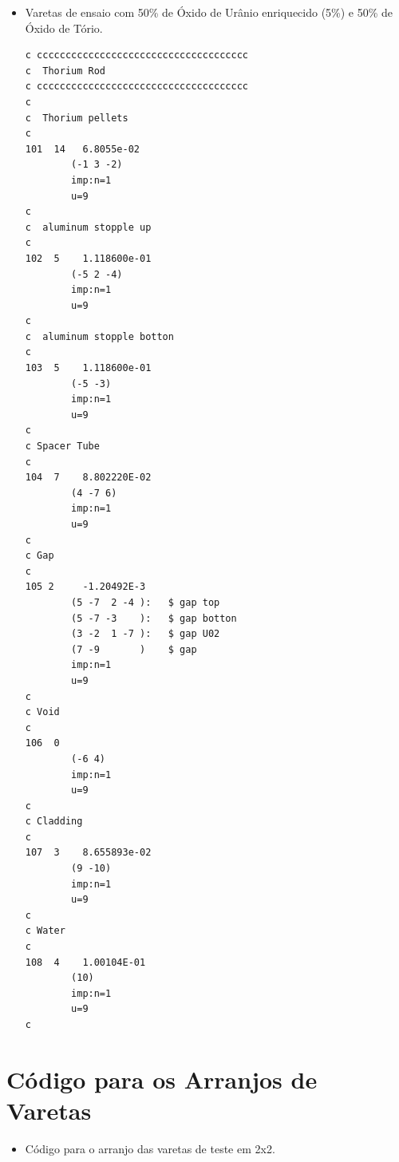 \documentclass[
	12pt,				%
	openany,			%
	twoside,			%
	a4paper,			%
	english,			%
	french,				%
	spanish,			%
	brazil				%
	]{abntex2}
\begin{document}
\begin{anexosenv}
\begin{itemize}
\item Varetas de ensaio com 50\% de Óxido de Urânio enriquecido (5\%) e 50\% de Óxido de Tório.
\begin{lstlisting}
c ccccccccccccccccccccccccccccccccccccc
c  Thorium Rod 
c ccccccccccccccccccccccccccccccccccccc
c
c  Thorium pellets
c
101  14   6.8055e-02
        (-1 3 -2)
        imp:n=1
        u=9
c
c  aluminum stopple up
c
102  5    1.118600e-01
        (-5 2 -4)
        imp:n=1
        u=9
c
c  aluminum stopple botton
c
103  5    1.118600e-01
        (-5 -3)
        imp:n=1
        u=9
c
c Spacer Tube
c 
104  7    8.802220E-02
        (4 -7 6) 
        imp:n=1
        u=9
c
c Gap 
c
105 2     -1.20492E-3
        (5 -7  2 -4 ):   $ gap top 
        (5 -7 -3    ):   $ gap botton
        (3 -2  1 -7 ):   $ gap U02
        (7 -9       )    $ gap    
        imp:n=1
        u=9
c
c Void 
c
106  0 
        (-6 4) 
        imp:n=1
        u=9
c
c Cladding
c
107  3    8.655893e-02
        (9 -10)
        imp:n=1
        u=9
c
c Water 
c 
108  4    1.00104E-01
        (10)
        imp:n=1
        u=9
c
\end{lstlisting}
\end{itemize}

\chapter{Código para os Arranjos de Varetas}
\begin{itemize}
\item Código para o arranjo das varetas de teste em 2x2.
\begin{lstlisting}


\end{lstlisting}
\end{itemize}
\end{anexosenv}
\end{document}
